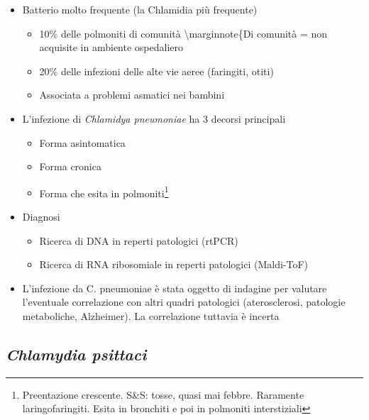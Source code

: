 \documentclass[italian,]{article}
\providecommand{\tightlist}{%
  \setlength{\itemsep}{0pt}\setlength{\parskip}{0pt}}
\begin{document}
\begin{itemize}
\tightlist
\item
  Batterio molto frequente (la Chlamidia più frequente)

  \begin{itemize}
  \tightlist
  \item
    10\% delle polmoniti di comunità \textbackslash{}marginnote\{Di
    comunità = non acquisite in ambiente ospedaliero
  \item
    20\% delle infezioni delle alte vie aeree (faringiti, otiti)
  \item
    Associata a problemi asmatici nei bambini
  \end{itemize}
\item
  L'infezione di \emph{Chlamidya pneumoniae} ha 3 decorsi principali

  \begin{itemize}
  \tightlist
  \item
    Forma asintomatica
  \item
    Forma cronica
  \item
    Forma che esita in polmoniti\footnote{Preentazione crescente. S\&S:
      tosse, quasi mai febbre. Raramente laringofaringiti. Esita in
      bronchiti e poi in polmoniti interstiziali}
  \end{itemize}
\item
  Diagnosi

  \begin{itemize}
  \tightlist
  \item
    Ricerca di DNA in reperti patologici (rtPCR)
  \item
    Ricerca di RNA ribosomiale in reperti patologici (Maldi-ToF)
  \end{itemize}
\item
  L'infezione da C. pneumoniae è stata oggetto di indagine per valutare
  l'eventuale correlazione con altri quadri patologici (aterosclerosi,
  patologie metaboliche, Alzheimer). La correlazione tuttavia è incerta
\end{itemize}

\hypertarget{chlamydia-psittaci}{%
\subsection{\texorpdfstring{\emph{Chlamydia
psittaci}}{Chlamydia psittaci}}\label{chlamydia-psittaci}}
\end{document}
